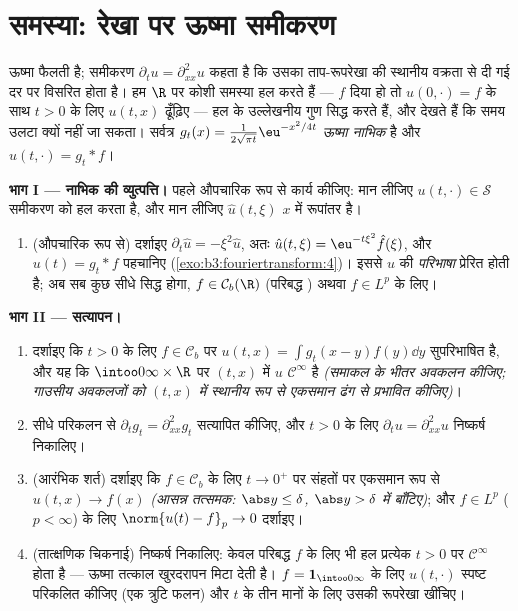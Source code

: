 \section{समस्या: रेखा पर ऊष्मा समीकरण}

\begin{problem}[{सप्ताहांत समस्या --- $\partial_tu =
\partial^2_{xx}u$, आरंभ से अंत तक हल}]
\label{pb:b3:fouriertransform:1}
ऊष्मा फैलती है; समीकरण $\partial_tu = \partial_{xx}^2u$ कहता है कि उसका  ताप-रूपरेखा की
स्थानीय वक्रता से दी गई दर पर विसरित होता है। हम $\R$ पर कोशी
समस्या हल करते हैं --- $f$ दिया हो तो $u(0, \cdot) = f$ के साथ $t > 0$ के लिए
$u(t, x)$ ढूँढ़िए --- हल के उल्लेखनीय गुण सिद्ध करते हैं, और देखते हैं
कि समय उलटा क्यों नहीं जा सकता। सर्वत्र $g_t(x) = \frac1{2\sqrt{\pi t}}\eu^{-x^2/4t}$ \emph{ऊष्मा
नाभिक} है और $u(t, \cdot) = g_t *
f$।

\medskip
\noindent\textbf{भाग I --- नाभिक की व्युत्पत्ति।} पहले औपचारिक रूप
से कार्य कीजिए: मान लीजिए $u(t, \cdot) \in \mathcal S$ समीकरण को हल करता है, और मान
लीजिए $\hat u(t, \xi)$ $x$ में रूपांतर है।
\begin{enumerate}
  \item (औपचारिक रूप से) दर्शाइए $\partial_t\hat u = -\xi^2\hat u$, अतः $\hat u(t,\xi) = \eu^{-t\xi^2}\hat f(\xi)$, और $u(t) = g_t * f$
        पहचानिए (\cref{exo:b3:fouriertransform:4})। इससे $u$ की \emph{परिभाषा} प्रेरित होती
        है; अब सब कुछ सीधे सिद्ध होगा, $f \in \mathcal C_b(\R)$ (परिबद्ध ) अथवा
        $f \in L^p$ के लिए।
\end{enumerate}

\medskip
\noindent\textbf{भाग II --- सत्यापन।}
\begin{enumerate}[resume]
  \item दर्शाइए कि $t > 0$ के लिए $f \in \mathcal
        C_b$ पर $u(t, x) = \int
        g_t(x-y)f(y)\dd y$ सुपरिभाषित है, और
        यह कि $\intoo0\infty\times\R$ पर $(t, x)$ में $u$ $\mathcal C^\infty$ है \emph{(समाकल के
        भीतर अवकलन कीजिए; गाउसीय अवकलजों को $(t,x)$ में स्थानीय रूप
        से एकसमान ढंग से प्रभावित कीजिए)}।
  \item सीधे परिकलन से $\partial_tg_t = \partial^2_{xx}g_t$ सत्यापित कीजिए, और $t > 0$ के लिए $\partial_tu =
        \partial^2_{xx}u$
        निष्कर्ष निकालिए।
  \item (आरंभिक शर्त) दर्शाइए कि $f \in \mathcal
        C_b$ के लिए $t \to 0^+$ पर संहतों पर
        एकसमान रूप से $u(t, x) \to f(x)$ \emph{(आसन्न तत्समक: $\abs y
        \leq \delta$, $\abs y > \delta$ में
        बाँटिए)}; और $f \in L^p$ ($p < \infty$) के लिए $\norm{u(t) - f}_p \to 0$ दर्शाइए।
  \item (तात्क्षणिक चिकनाई) निष्कर्ष निकालिए: केवल परिबद्ध 
        $f$ के लिए भी हल प्रत्येक $t > 0$ पर $\mathcal C^\infty$ होता है ---
        ऊष्मा तत्काल खुरदरापन मिटा देती है। $f =
        \mathbf 1_{\intoo0\infty}$ के लिए $u(t, \cdot)$
        स्पष्ट परिकलित कीजिए (एक त्रुटि फलन) और $t$ के तीन
        मानों के लिए उसकी रूपरेखा खींचिए।
\end{enumerate}


\end{problem}
